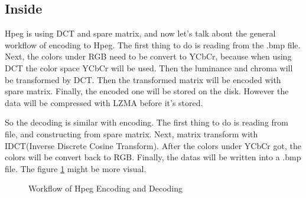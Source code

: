 \documentclass{article}
\begin{document}
\subsection{Inside}
\label{sec:hpeg:inside}

Hpeg is using DCT and spare matrix, and now let's talk about the general workflow of encoding to Hpeg. The first thing to do is reading from the .bmp file.
Next, the colors under RGB need to be convert to YCbCr, because when using DCT the color space YCbCr will be used. 
Then the luminance and chroma will be transformed by DCT. Then the transformed matrix will be encoded with spare matrix.
Finally, the encoded one will be stored on the disk. However the data will be compressed with LZMA before it's stored.

So the decoding is similar with encoding. The first thing to do is reading from file, and constructing from spare matrix.
Next, matrix transform with IDCT(Inverse Discrete Cosine Transform). After the colors under YCbCr got, the colors will be convert
back to RGB. Finally, the datas will be written into a .bmp file. The figure \ref{fig:hpeg:workflow} might be more visual.

\begin{figure}
    \centering
    \caption{Workflow of Hpeg Encoding and Decoding}
    \label{fig:hpeg:workflow}
\end{figure}
\end{document}
